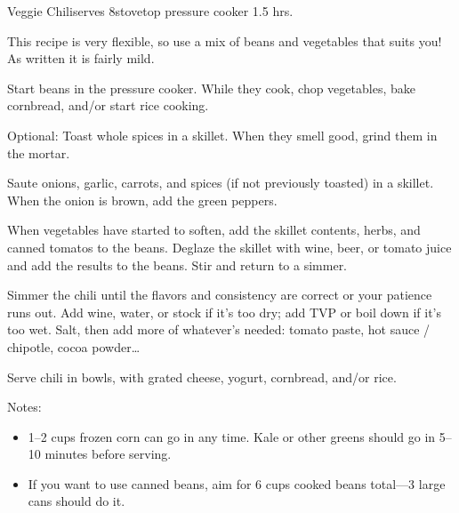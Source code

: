 
\begin{recipe}{Veggie Chili}{serves 8}{stovetop \hfill pressure cooker \hfill 1.5 hrs.}

 \freeform This recipe is very flexible, so use a mix of beans and vegetables that suits you! As written it is fairly mild.

 Start beans in the pressure cooker. While they cook, chop vegetables, bake cornbread, and/or start rice cooking.

 Optional: Toast whole spices in a skillet. When they smell good, grind them in the mortar.

 Saute onions, garlic, carrots, and spices (if not previously toasted) in a skillet. When the onion is brown, add the green peppers.

 When vegetables have started to soften, add the skillet contents, herbs, and canned tomatos to the beans. Deglaze the skillet with wine, beer, or tomato juice and add the results to the beans. Stir and return to a simmer.

 \newstep Simmer the chili until the flavors and consistency are correct or your patience runs out. Add wine, water, or stock if it's too dry; add TVP or boil down if it's too wet. Salt, then add more of whatever's needed: tomato paste, hot sauce / chipotle, cocoa powder\dots

 \newstep Serve chili in bowls, with grated cheese, yogurt, cornbread, and/or rice.

 \freeform Notes:
 \begin{itemize}
  \item 1--2 cups frozen corn can go in any time. Kale or other greens should go in 5--10 minutes before serving.
  \item If you want to use canned beans, aim for 6 cups cooked beans total---3 large cans should do it.
 \end{itemize}
\end{recipe}
